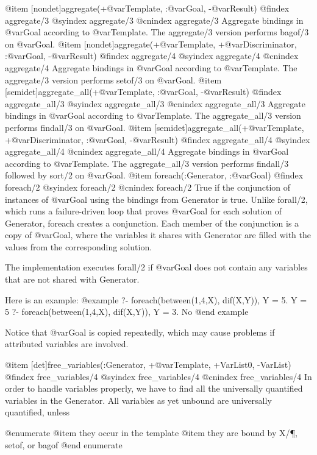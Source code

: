 {{{{{{{{{@item [nondet]aggregate(+@var{Template}, :@var{Goal}, -@var{Result})
@findex aggregate/3
@syindex aggregate/3
@cnindex aggregate/3
    Aggregate bindings in @var{Goal} according to @var{Template}. The
    aggregate/3 version performs bagof/3 on @var{Goal}.
@item [nondet]aggregate(+@var{Template}, +@var{Discriminator}, :@var{Goal}, -@var{Result})
@findex aggregate/4
@syindex aggregate/4
@cnindex aggregate/4
    Aggregate bindings in @var{Goal} according to @var{Template}. The
    aggregate/3 version performs setof/3 on @var{Goal}.
@item [semidet]aggregate_all(+@var{Template}, :@var{Goal}, -@var{Result})
@findex aggregate_all/3
@syindex aggregate_all/3
@cnindex aggregate_all/3
    Aggregate bindings in @var{Goal} according to @var{Template}. The
    aggregate_all/3 version performs findall/3 on @var{Goal}.
@item [semidet]aggregate_all(+@var{Template}, +@var{Discriminator}, :@var{Goal}, -@var{Result})
@findex aggregate_all/4
@syindex aggregate_all/4
@cnindex aggregate_all/4
    Aggregate bindings in @var{Goal} according to @var{Template}. The
    aggregate_all/3 version performs findall/3 followed by sort/2 on
    @var{Goal}.
@item foreach(:Generator, :@var{Goal})
@findex foreach/2
@syindex foreach/2
@cnindex foreach/2
    True if the conjunction of instances of @var{Goal} using the
    bindings from Generator is true. Unlike forall/2, which runs a
    failure-driven loop that proves @var{Goal} for each solution of
    Generator, foreach creates a conjunction. Each member of the
    conjunction is a copy of @var{Goal}, where the variables it shares
    with Generator are filled with the values from the corresponding
    solution.

    The implementation executes forall/2 if @var{Goal} does not contain
    any variables that are not shared with Generator.

    Here is an example:
@example
    ?- foreach(between(1,4,X), dif(X,Y)), Y = 5.
    Y = 5
    ?- foreach(between(1,4,X), dif(X,Y)), Y = 3.
    No
@end example

    Notice that @var{Goal} is copied repeatedly, which may cause
    problems if attributed variables are involved.

@item [det]free_variables(:Generator, +@var{Template}, +VarList0, -VarList)
@findex free_variables/4
@syindex free_variables/4
@cnindex free_variables/4
    In order to handle variables properly, we have to find all the universally quantified variables in the Generator. All variables as yet unbound are universally quantified, unless

@enumerate
@item they occur in the template
@item they are bound by X/\P, setof, or bagof
@end enumerate

}}}}}}}}}
